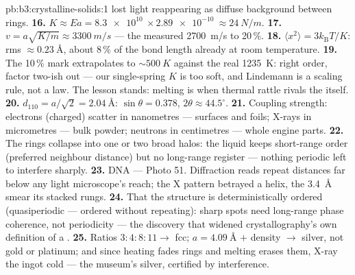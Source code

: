 \begin{solution}{pb:b3:crystalline-solids:1}
lost light reappearing as diffuse background between rings.
\textbf{16.} $K \approx Ea = \qty{8.3e10}{}\times
\qty{2.89e-10}{} \approx \qty{24}{N/m}$.
\textbf{17.} $v = a\sqrt{K/m} \approx \qty{3300}{m/s}$ ---
the measured \qty{2700}{m/s} to 20\,\%.
\textbf{18.} $\langle x^2\rangle = 3k_{\text{B}}T/K$: rms
$\approx\qty{0.23}{\angstrom}$, about 8\,\% of the bond length
already at room temperature.
\textbf{19.} The 10\,\% mark extrapolates to $\sim\qty{500}{K}$
against the real \qty{1235}{K}: right order, factor two-ish out
--- our single-spring $K$ is too soft, and Lindemann is a scaling
rule, not a law. The lesson stands: melting is when thermal
rattle rivals the  itself.
\textbf{20.} $d_{110} = a/\sqrt2 = \qty{2.04}{\angstrom}$:
$\sin\theta = 0.378$, $2\theta \approx 44.5^\circ$.
\textbf{21.} Coupling strength: electrons (charged) scatter in
nanometres --- surfaces and foils; X-rays in micrometres ---
bulk powder; neutrons in centimetres --- whole engine parts.
\textbf{22.} The rings collapse into one or two broad halos:
the liquid keeps short-range order (preferred neighbour
distance) but no long-range register --- nothing periodic left to
interfere sharply.
\textbf{23.} DNA --- Photo 51. Diffraction reads repeat
distances far below any light microscope's reach; the X pattern
betrayed a helix, the \qty{3.4}{\angstrom} smear its stacked
rungs.
\textbf{24.} That the structure is deterministically ordered
(quasiperiodic --- ordered without repeating): sharp spots need
long-range phase coherence, not periodicity --- the discovery
that widened crystallography's own definition of a .
\textbf{25.} Ratios $3:4:8:11 \to$ fcc; $a = \qty{4.09}{\angstrom}$
$+$ density $\to$ silver, not gold or platinum; and since heating
fades rings and melting erases them, X-ray the ingot cold ---
the museum's silver, certified by interference.
\end{solution}

